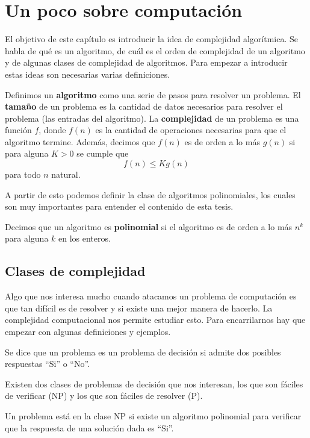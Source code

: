 \chapter{Un poco sobre computación}

El objetivo de este capítulo es introducir la idea de complejidad algorítmica. Se habla de qué es un algoritmo, de cuál es el orden de complejidad de un algoritmo y de algunas clases de complejidad de algoritmos. Para empezar a introducir estas ideas son necesarias varias definiciones. 

\begin{dfn} 
Definimos un \textbf{algoritmo} como una serie de pasos para resolver un problema. El \textbf{tamaño} de un problema es la cantidad de datos necesarios para resolver el problema (las entradas del algoritmo). La \textbf{complejidad} de un problema es una función $f$, donde $f(n)$ es la cantidad de operaciones necesarias para que el algoritmo termine. Además, decimos que $f(n)$ es de orden a lo más $g(n)$ si para alguna $K>0$ se cumple que
$$f(n) \leq Kg(n)$$
para todo $n$ natural.
\end{dfn}

A partir de esto podemos definir la clase de algoritmos polinomiales, los cuales son muy importantes para entender el contenido de esta tesis. 

\begin{dfn}
Decimos que un algoritmo es \textbf{polinomial} si el algoritmo es de orden a lo más $n^k$ para alguna $k$ en los enteros. 
\end{dfn}


\section{Clases de complejidad}
Algo que nos interesa mucho cuando atacamos un problema de computación es que tan difícil es de resolver y si existe una mejor manera de hacerlo. La complejidad computacional nos permite estudiar esto. Para encarrilarnos hay que empezar con algunas definiciones y ejemplos.
\begin{dfn}
Se dice que un problema es un problema de decisión si admite dos posibles respuestas ``Si'' o ``No''. 
\end{dfn}
Existen dos clases de problemas de decisión que nos interesan, los que son fáciles de verificar (NP) y los que son fáciles de resolver (P).
\begin{dfn}
Un problema está en la clase NP si existe un algoritmo polinomial para verificar que la respuesta de una solución dada es ``Si''.
\end{dfn}

